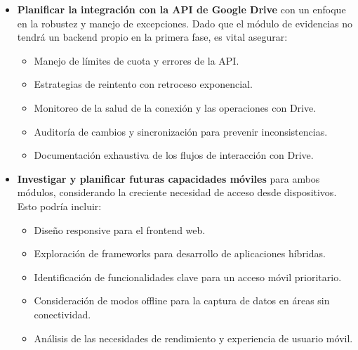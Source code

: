 \begin{itemize}
    \item \textbf{Planificar la integración con la API de Google Drive} con un enfoque
        en la robustez y manejo de excepciones. Dado que el módulo de evidencias no
        tendrá un backend propio en la primera fase, es vital asegurar:
        \begin{itemize}
            \item Manejo de límites de cuota y errores de la API.
            \item Estrategias de reintento con retroceso exponencial.
            \item Monitoreo de la salud de la conexión y las operaciones con Drive.
            \item Auditoría de cambios y sincronización para prevenir inconsistencias.
            \item Documentación exhaustiva de los flujos de interacción con Drive.
        \end{itemize}

    \item \textbf{Investigar y planificar futuras capacidades móviles} para ambos módulos,
        considerando la creciente necesidad de acceso desde dispositivos. Esto podría incluir:
        \begin{itemize}
            \item Diseño responsive para el frontend web.
            \item Exploración de frameworks para desarrollo de aplicaciones híbridas.
            \item Identificación de funcionalidades clave para un acceso móvil prioritario.
            \item Consideración de modos offline para la captura de datos en áreas sin conectividad.
            \item Análisis de las necesidades de rendimiento y experiencia de usuario móvil.
        \end{itemize}
\end{itemize}


